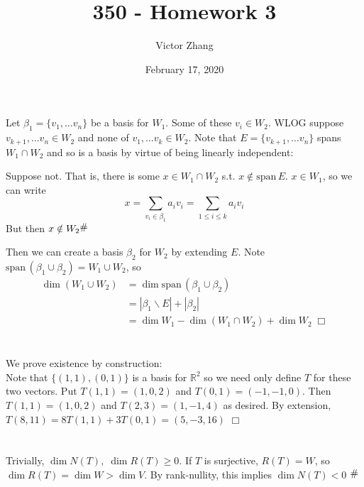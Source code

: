 \documentclass{article}
\title{350 - Homework 3}
\author{Victor Zhang }
\date{February 17, 2020}
\newcommand{\contra}{\raisebox{\depth}{\#}}
\newenvironment{myindentpar}[1]
  {\begin{list}{}
          {\setlength{\leftmargin}{#1}}
          \item[]
  }
  {\end{list}}
\begin{document}
\maketitle

\section{}
Let $\beta_1 = \{v_1, \dots v_n\}$ be a basis for $W_1$. Some of these $v_i \in W_2$. WLOG suppose $v_{k+1}, \dots v_n \in W_2$ and none of $v_1, \dots v_k \in W_2$. Note that $E = \{v_{k+1}, \dots v_n\}$ spans $W_1 \cap W_2$ and so is a basis by virtue of being linearly independent:
\begin{myindentpar}{2em}
    Suppose not. That is, there is some $x \in W_1 \cap W_2$ s.t. $x \notin \textrm{span}\,E$. $x \in W_1$, so we can write
    $$x = \sum\limits_{v_i \in \beta_1} a_i v_i = \sum\limits_{1 \leq i \leq k} a_i v_i$$
    But then $x \notin W_2 \contra$
\end{myindentpar}
Then we can create a basis $\beta_2$ for $W_2$ by extending $E$. Note $\mathrm{span}\,(\beta_1 \cup \beta_2) = W_1 \cup W_2$, so
\begin{equation*}
    \begin{split}
    \dim (W_1 \cup W_2) &= \dim \textrm{span}\,(\beta_1 \cup \beta_2)\\
    &= |\beta_1 \backslash E| + |\beta_2|\\
    &= \dim W_1 - \dim (W_1 \cap W_2) + \dim W_2 \; \Box
    \end{split}
\end{equation*}

\section{}
We prove existence by construction:\\
Note that $\{(1,1),(0,1)\}$ is a basis for $\mathbb{R}^2$ so we need only define $T$ for these two vectors. Put $T(1,1) = (1,0,2)$ and $T(0,1) = (-1,-1,0)$. Then $T(1,1) = (1,0,2)$ and $T(2,3) = (1,-1,4)$ as desired. By extension, $T(8,11) = 8T(1,1) + 3T(0,1) = (5,-3,16)$ $\Box$

\section{}
Trivially, $\dim N(T),\; \dim R(T) \geq 0$. If $T$ is surjective, $R(T) = W$, so $\dim R(T) = \dim W > \dim V$. By rank-nullity, this implies $\dim N(T) < 0$ $\contra$
\end{document}
